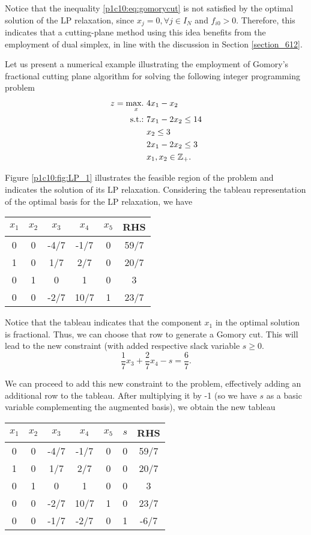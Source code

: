 Notice that the inequality \eqref{p1c10:eq:gomorycut} is not satisfied by the optimal solution of the LP relaxation, since $x_j = 0, \forall j \in I_N$ and $f_{i0} > 0$. Therefore, this indicates that a cutting-plane method using this idea benefits from the employment of dual simplex, in line with the discussion in Section \ref{section_612}. 

Let us present a numerical example illustrating the employment of Gomory's fractional cutting plane algorithm for solving the following integer programming problem
%
\begin{align*}
	z = \mathop{\text{max.~}}_x & 4x_1 - x_2\\
	\mathop{\text{s.t.:~}} & 7x_1 - 2x_2 \leq 14\\
	& x_2 \leq 3 \\
	&2x_1 -2x_2 \leq 3 \\
	&x_1, x_2 \in \mathbb{Z}_+. 
\end{align*}

Figure \ref{p1c10:fig:LP_1} illustrates the feasible region of the problem and indicates the solution of its LP relaxation. Considering the tableau representation of the optimal basis for the LP relaxation, we have

\begin{center}
	\begin{tabular}{ccccc|c} 
		$x_1$ & $x_2$ & $x_3$ & $x_4$ & $x_5$ & RHS \\ \hline
		0 & 0 & -4/7 & -1/7 & 0 & 59/7 \\ \hline 
		1 & 0 & 1/7 & 2/7 & 0 & 20/7 \\
		0 & 1 &  0  &  1  & 0 & 3 \\
		0 & 0 & -2/7 & 10/7 & 1 & 23/7
	\end{tabular}	
\end{center}

Notice that the tableau indicates that the component $x_1$ in the optimal solution is fractional. Thus, we can choose that row to generate a Gomory cut. This will lead to the new constraint (with added respective slack variable $s \ge 0$.
%
\begin{equation*}
	\frac{1}{7}x_3 + \frac{2}{7}x_4 - s = \frac{6}{7}.	
\end{equation*}

We can proceed to add this new constraint to the problem, effectively adding an additional row to the tableau. After multiplying it by -1 (so we have $s$ as a basic variable complementing the augmented basis), we obtain the new tableau

\begin{center}
	\begin{tabular}{cccccc|c}
		$x_1$ & $x_2$ & $x_3$ & $x_4$ & $x_5$ & $s$ & RHS \\ \hline
		0 & 0 & -4/7 & -1/7 &  0 & 0 & 59/7 \\ \hline
		1 & 0 & 1/7 & 2/7   &  0 & 0 & 20/7 \\
		0 & 1 &  0  &  1    &  0 & 0 & 3    \\
		0 & 0 &-2/7 & 10/7  &  1 & 0 & 23/7 \\
		0 & 0 &-1/7 & -2/7  &  0 & 1 & -6/7 
	\end{tabular}	
\end{center}


